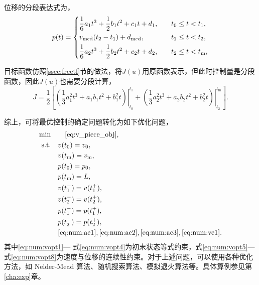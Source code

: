 位移的分段表达式为，
\begin{equation}
p(t)=
\begin{dcases}
\frac16 a_1t^3+\frac12b_1t^2+c_1t+d_1,\quad& t_0\leq t < t_1,\\
v_\mathrm{med}(t_2-t_1)+d_\mathrm{med}, \quad& t_1\leq t < t_2,\\
\frac16 a_2t^3+\frac12b_2t^2+c_2t+d_2,\quad& t_2\leq t < t_\mathrm{m},
\end{dcases}
\end{equation}

目标函数仿照\ref{ssec:freetf}节的做法，将$J(u)$用原函数表示，但此时控制量是分段函数，因此$J(u)$也需要分段计算，
\begin{equation}
J=\frac12\left[\left.\left(\frac13a_1^2t^3+a_1b_1t^2+b_1^2t\right)\right|_{t_0}^{t_1}+\left.\left(\frac13a_2^2t^3+a_2b_2t^2+b_2^2t\right)\right|_{t_2}^{t_\mathrm{m}}\right].
\label{eq:v_piece_obj}
\end{equation}

综上，可将最优控制的确定问题转化为如下优化问题，
\begin{align}
\min\quad& \quad\eqref{eq:v_piece_obj},\label{eq:num:vopt0}\\
\text{s.t.}
\quad & v(t_0)=v_0,\label{eq:num:vopt1}\\
\quad & v(t_\mathrm{m})=v_\mathrm{m},\\
\quad & p(t_0)=p_0,\\
\quad & p(t_\mathrm{m})=L,\label{eq:num:vopt4}\\
\quad & v(t_1^-)=v(t_1^+),\label{eq:num:vopt5}\\
\quad & v(t_2^-)=v(t_2^+),\\
\quad & p(t_1^-)=p(t_1^+),\\
\quad & p(t_2^-)=p(t_2^+),\label{eq:num:vopt8}\\
\quad & \eqref{eq:num:ac1},\eqref{eq:num:ac2},\eqref{eq:num:ac3},\eqref{eq:num:vc1}.\label{eq:num:vopt9}
\end{align}
其中\eqref{eq:num:vopt1}--- 式\eqref{eq:num:vopt4}为初末状态等式约束，式\eqref{eq:num:vopt5}--- 式\eqref{eq:num:vopt8}为速度与位移的连续性约束。对于上述问题，可以使用各种优化方法，如 Nelder-Mead 算法、随机搜索算法、模拟退火算法等。具体算例参见第\ref{cha:exp}章。

